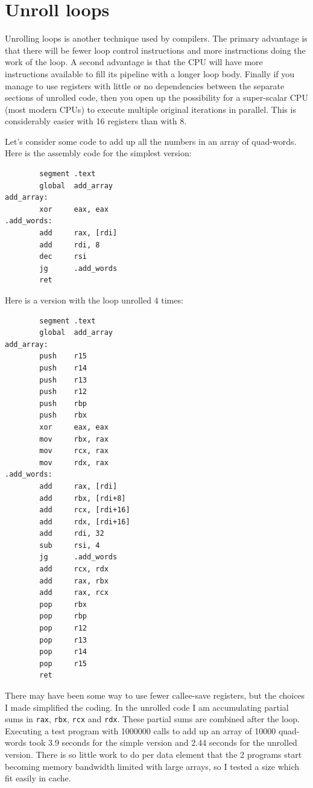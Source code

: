 \documentclass[11pt,b5paper]{book}
\begin{document}
\section{Unroll loops}

Unrolling loops is another technique used by compilers.
The primary advantage is that there will be fewer loop control instructions
and more instructions doing the work of the loop.
A second advantage is that the CPU will have more instructions available to fill
its pipeline with a longer loop body.
Finally if you manage to use registers with little or no dependencies between
the separate sections of unrolled code, then you open up the possibility for
a super-scalar CPU (most modern CPUs) to execute multiple original iterations
in parallel.
This is considerably easier with 16 registers than with 8.

Let's consider some code to add up all the numbers in an array of quad-words.
Here is the assembly code for the simplest version:
\begin{verbatim}
        segment .text
        global  add_array
add_array:
        xor     eax, eax
.add_words:
        add     rax, [rdi]
        add     rdi, 8
        dec     rsi
        jg      .add_words
        ret
\end{verbatim}

Here is a version with the loop unrolled 4 times:
\begin{verbatim}
        segment .text
        global  add_array
add_array:
        push    r15
        push    r14
        push    r13
        push    r12
        push    rbp
        push    rbx
        xor     eax, eax
        mov     rbx, rax
        mov     rcx, rax
        mov     rdx, rax
.add_words:
        add     rax, [rdi]
        add     rbx, [rdi+8]
        add     rcx, [rdi+16]
        add     rdx, [rdi+16]
        add     rdi, 32
        sub     rsi, 4
        jg      .add_words
        add     rcx, rdx
        add     rax, rbx
        add     rax, rcx
        pop     rbx
        pop     rbp
        pop     r12
        pop     r13
        pop     r14
        pop     r15
        ret
\end{verbatim}

There may have been some way to use fewer callee-save registers, but the
choices I made simplified the coding.
In the unrolled code I am accumulating partial sums in {\tt rax}, {\tt rbx},
{\tt rcx} and {\tt rdx}.
These partial sums are combined after the loop.
Executing a test program with 1000000 calls to add up an array of 10000 quad-words took 3.9 seconds for the simple version and 2.44 seconds for the unrolled
version.
There is so little work to do per data element that the 2 programs start becoming
memory bandwidth limited with large arrays, so I tested a size which fit easily in cache.
\end{document}
